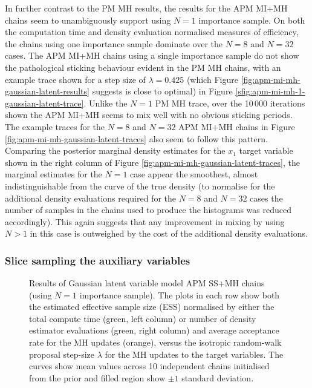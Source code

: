 In further contrast to the \ac{PM} \ac{MH} results, the results for the \ac{APM} \ac{MI}+\ac{MH} chains seem to unambiguously support using $N=1$ importance sample. On both the computation time and density evaluation normalised measures of efficiency, the chains using one importance sample dominate over the $N=8$ and $N=32$ cases. The \ac{APM} \ac{MI}+\ac{MH} chains using a single importance sample do not show the pathological sticking behaviour evident in the \ac{PM} \ac{MH} chains, with an example trace shown for a step size of $\lambda = 0.425$ (which Figure \ref{fig:apm-mi-mh-gaussian-latent-results} suggests is close to optimal) in Figure \ref{sfig:apm-mi-mh-1-gaussian-latent-trace}. Unlike the $N=1$ \ac{PM} \ac{MH} trace, over the 10\,000 iterations shown the \ac{APM} \ac{MI}+\ac{MH} seems to mix well with no obvious sticking periods. The example traces for the $N=8$ and $N=32$ \ac{APM} \ac{MI}+\ac{MH} chains in Figure \ref{fig:apm-mi-mh-gaussian-latent-traces} also seem to follow this pattern. Comparing the posterior marginal density estimates for the $x_1$ target variable shown in the right column of Figure \ref{fig:apm-mi-mh-gaussian-latent-traces}, the marginal estimates for the $N=1$ case appear the smoothest, almost indistinguishable from the curve of the true density (to normalise for the additional density evaluations required for the $N=8$ and $N=32$ cases the number of samples in the chains used to produce the histograms was reduced accordingly). This again suggests that any improvement in mixing by using $N > 1$ in this case is outweighed by the cost of the additional density evaluations.

\subsubsection{Slice sampling the auxiliary variables}

\begin{figure}
\centering
\caption[\acs{APM} \acs{SS}+\acs{MH} Gaussian model results.]{
Results of Gaussian latent variable model \acs{APM} \acs{SS}+\acs{MH} chains (using $N=1$ importance sample). The plots in each row show both the estimated effective sample size (ESS) normalised by either the total compute time (green, left column) or number of density estimator evaluations (green, right column) and average acceptance rate for the \ac{MH} updates (orange), versus the isotropic random-walk proposal step-size $\lambda$ for the \ac{MH} updates to the target variables. The curves show mean values across 10 independent chains initialised from the prior and filled region show $\pm 1$ standard deviation.}
\label{fig:apm-ss-mh-gaussian-latent-results}
\end{figure}

